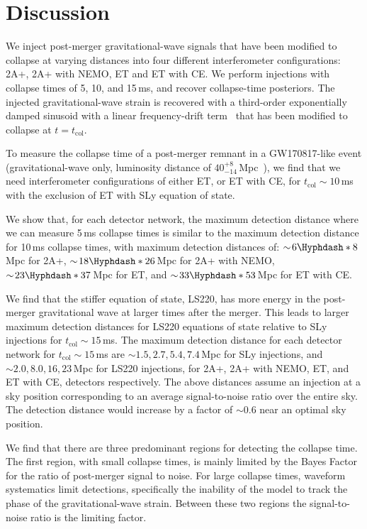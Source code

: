 \documentclass[
reprint,
prd,
twocolumn,
nofootinbib,
tightenlines %
floatfix,
 amsmath,
showpacs ,amssymb, aps,%
superscriptaddress
]{revtex4-1}
\newcommand{\tc}{t_{\mathrm{col}}}
\begin{document}
\section{Discussion}\label{sec:discussion}

    We inject post-merger gravitational-wave signals that have been modified to collapse at varying distances into four different interferometer configurations: 2A+, 2A+ with NEMO, ET and ET with CE.
    We perform injections with collapse times of 5, 10, and 15\,ms, and recover collapse-time posteriors.
    The injected gravitational-wave strain is recovered with a third-order exponentially damped sinusoid with a linear frequency-drift term~\cite{Easter2020} that has been modified to collapse at $t=\tc$. \par
    
    To measure the collapse time of a post-merger remnant in a GW170817-like event (gravitational-wave only, luminosity distance of $40^{+8}_{-14}$\,Mpc~\cite{GW170817multi}), we find that we need interferometer configurations of either ET, or ET with CE, for $\tc \sim\!10$\,ms with the exclusion of ET with SLy equation of state.
    
    
    We show that, for each detector network, the maximum detection distance where we can measure 5\,ms collapse times is similar to the maximum detection distance for 10\,ms collapse times, with maximum detection distances of: $\sim\!6\Hyphdash*8$\,Mpc for 2A+, $\sim\!18\Hyphdash*26$\,Mpc for 2A+ with NEMO, $\sim\!23\Hyphdash*37$\,Mpc for ET, and $\sim\!33\Hyphdash*53$\,Mpc for ET with CE.\par
    
    We find that the stiffer equation of state, LS220, has more energy in the post-merger gravitational wave at larger times after the merger.
    This leads to larger maximum detection distances for LS220 equations of state relative to SLy injections for $\tc\sim\!15$\,ms.
    The maximum detection distance for each detector network for $\tc\sim\!15$\,ms are $\sim 1.5, 2.7, 5.4, 7.4$\,Mpc for SLy injections, and $\sim 2.0, 8.0, 16, 23$\,Mpc for LS220 injections, for 2A+, 2A+ with NEMO, ET, and ET with CE, detectors respectively.
    The above distances assume an injection at a sky position corresponding to an average signal-to-noise ratio over the entire sky.
    The detection distance would increase by a factor of $\sim\!0.6$ near an optimal sky position. \par
    
    We find that there are three predominant regions for detecting the collapse time. The first region, with small collapse times, is mainly limited by the Bayes Factor for the ratio of post-merger signal to noise. 
    For large collapse times, waveform systematics limit detections, specifically the inability of the model to track the phase of the gravitational-wave strain.
    Between these two regions the signal-to-noise ratio is the limiting factor.\par
    
\end{document}
